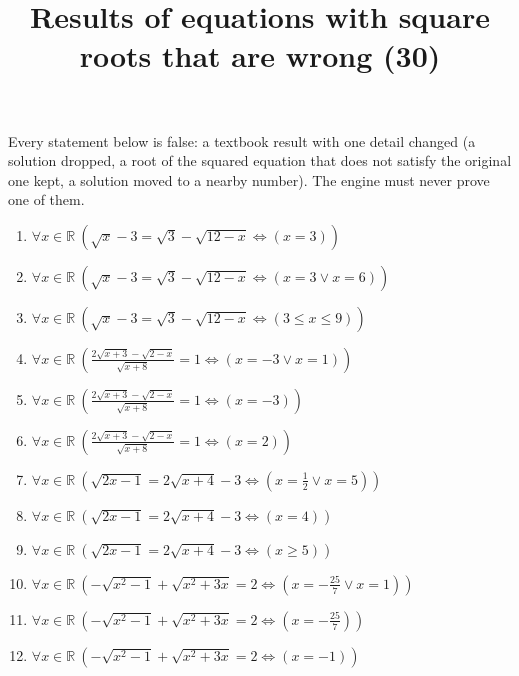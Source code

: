 \documentclass[11pt,a4paper]{article}
\title{Results of equations with square roots that are wrong (30)}
\author{}
\date{}
\begin{document}
\maketitle
Every statement below is false: a textbook result with one detail changed (a solution dropped, a root of the squared equation that does not satisfy the original one kept, a solution moved to a nearby number). The engine must never prove one of them.

\begin{enumerate}
\item $\displaystyle \forall x \in \mathbb{R}\ \left( \sqrt{x} - 3 = \sqrt{3} - \sqrt{12 - x} \iff \left( x = 3 \right) \right)$
\item $\displaystyle \forall x \in \mathbb{R}\ \left( \sqrt{x} - 3 = \sqrt{3} - \sqrt{12 - x} \iff \left( x = 3 \lor x = 6 \right) \right)$
\item $\displaystyle \forall x \in \mathbb{R}\ \left( \sqrt{x} - 3 = \sqrt{3} - \sqrt{12 - x} \iff \left( 3 \le x \le 9 \right) \right)$
\item $\displaystyle \forall x \in \mathbb{R}\ \left( \frac{2\sqrt{x + 3} - \sqrt{2 - x}}{\sqrt{x + 8}} = 1 \iff \left( x = -3 \lor x = 1 \right) \right)$
\item $\displaystyle \forall x \in \mathbb{R}\ \left( \frac{2\sqrt{x + 3} - \sqrt{2 - x}}{\sqrt{x + 8}} = 1 \iff \left( x = -3 \right) \right)$
\item $\displaystyle \forall x \in \mathbb{R}\ \left( \frac{2\sqrt{x + 3} - \sqrt{2 - x}}{\sqrt{x + 8}} = 1 \iff \left( x = 2 \right) \right)$
\item $\displaystyle \forall x \in \mathbb{R}\ \left( \sqrt{2x - 1} = 2\sqrt{x + 4} - 3 \iff \left( x = \frac{1}{2} \lor x = 5 \right) \right)$
\item $\displaystyle \forall x \in \mathbb{R}\ \left( \sqrt{2x - 1} = 2\sqrt{x + 4} - 3 \iff \left( x = 4 \right) \right)$
\item $\displaystyle \forall x \in \mathbb{R}\ \left( \sqrt{2x - 1} = 2\sqrt{x + 4} - 3 \iff \left( x \ge 5 \right) \right)$
\item $\displaystyle \forall x \in \mathbb{R}\ \left( -\sqrt{x^{2} - 1} + \sqrt{x^{2} + 3x} = 2 \iff \left( x = -\frac{25}{7} \lor x = 1 \right) \right)$
\item $\displaystyle \forall x \in \mathbb{R}\ \left( -\sqrt{x^{2} - 1} + \sqrt{x^{2} + 3x} = 2 \iff \left( x = -\frac{25}{7} \right) \right)$
\item $\displaystyle \forall x \in \mathbb{R}\ \left( -\sqrt{x^{2} - 1} + \sqrt{x^{2} + 3x} = 2 \iff \left( x = -1 \right) \right)$

\end{enumerate}
\end{document}
